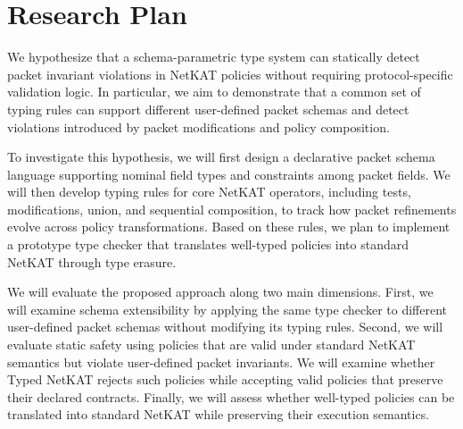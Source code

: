 \section{Research Plan}

We hypothesize that a schema-parametric type system can statically detect packet invariant violations in NetKAT
policies without requiring protocol-specific validation logic. In particular, we aim to demonstrate that a common set of typing rules can support different user-defined packet schemas and detect violations introduced by packet modifications and policy composition.

To investigate this hypothesis, we will first design a declarative packet schema language supporting nominal field types and constraints among packet fields. We will then develop typing rules for core NetKAT operators, including tests, modifications, union, and sequential composition, to track how packet refinements evolve across policy transformations. Based on these rules, we plan to implement a prototype type checker that translates well-typed policies into standard NetKAT through type erasure.

We will evaluate the proposed approach along two main dimensions. First, we will examine schema extensibility by applying the same type checker to different user-defined packet schemas without modifying its typing rules. Second, we will evaluate static safety using policies that are valid under standard NetKAT semantics but violate user-defined packet invariants. We will examine whether Typed NetKAT rejects such policies while accepting valid policies that preserve their declared contracts. Finally, we will assess whether well-typed policies can be translated into standard NetKAT while preserving their execution semantics.